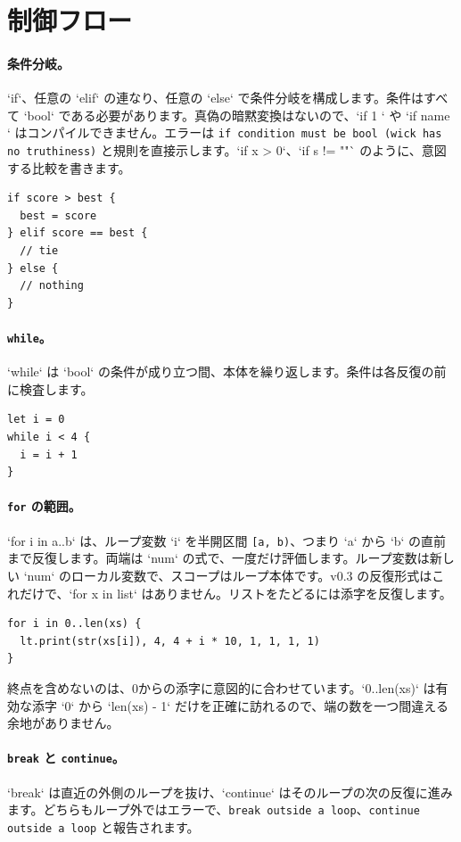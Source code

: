 \section{制御フロー}

\paragraph{条件分岐。} `if`、任意の `elif` の連なり、任意の `else` で条件分岐を構成します。条件はすべて `bool` である必要があります。真偽の暗黙変換はないので、`if 1 { }` や `if name { }` はコンパイルできません。エラーは \texttt{if condition must be bool (wick has no truthiness)} と規則を直接示します。`if x > 0`、`if s != ""` のように、意図する比較を書きます。

\begin{lstlisting}[language=wick]
if score > best {
  best = score
} elif score == best {
  // tie
} else {
  // nothing
}
\end{lstlisting}

\paragraph{\texttt{while}。} `while` は `bool` の条件が成り立つ間、本体を繰り返します。条件は各反復の前に検査します。

\begin{lstlisting}[language=wick]
let i = 0
while i < 4 {
  i = i + 1
}
\end{lstlisting}

\paragraph{\texttt{for} の範囲。} `for i in a..b` は、ループ変数 `i` を半開区間 \texttt{[a, b)}、つまり `a` から `b` の直前まで反復します。両端は `num` の式で、一度だけ評価します。ループ変数は新しい `num` のローカル変数で、スコープはループ本体です。v0.3 の反復形式はこれだけで、`for x in list` はありません。リストをたどるには添字を反復します。

\begin{lstlisting}[language=wick]
for i in 0..len(xs) {
  lt.print(str(xs[i]), 4, 4 + i * 10, 1, 1, 1, 1)
}
\end{lstlisting}

\noindent
終点を含めないのは、0からの添字に意図的に合わせています。`0..len(xs)` は有効な添字 `0` から `len(xs) - 1` だけを正確に訪れるので、端の数を一つ間違える余地がありません。

\paragraph{\texttt{break} と \texttt{continue}。} `break` は直近の外側のループを抜け、`continue` はそのループの次の反復に進みます。どちらもループ外ではエラーで、\texttt{break outside a loop}、\texttt{continue outside a loop} と報告されます。

